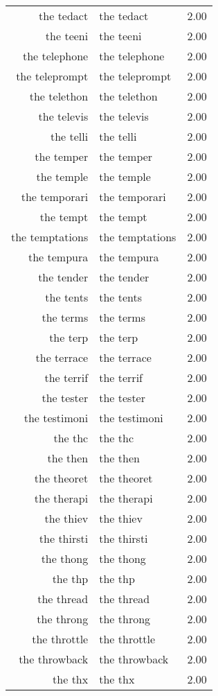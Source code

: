 \begin{table}[ht]
\begin{tabular}{rlr}
  the tedact & the tedact & 2.00 \\ 
  the teeni & the teeni & 2.00 \\ 
  the telephone & the telephone & 2.00 \\ 
  the teleprompt & the teleprompt & 2.00 \\ 
  the telethon & the telethon & 2.00 \\ 
  the televis & the televis & 2.00 \\ 
  the telli & the telli & 2.00 \\ 
  the temper & the temper & 2.00 \\ 
  the temple & the temple & 2.00 \\ 
  the temporari & the temporari & 2.00 \\ 
  the tempt & the tempt & 2.00 \\ 
  the temptations & the temptations & 2.00 \\ 
  the tempura & the tempura & 2.00 \\ 
  the tender & the tender & 2.00 \\ 
  the tents & the tents & 2.00 \\ 
  the terms & the terms & 2.00 \\ 
  the terp & the terp & 2.00 \\ 
  the terrace & the terrace & 2.00 \\ 
  the terrif & the terrif & 2.00 \\ 
  the tester & the tester & 2.00 \\ 
  the testimoni & the testimoni & 2.00 \\ 
  the thc & the thc & 2.00 \\ 
  the then & the then & 2.00 \\ 
  the theoret & the theoret & 2.00 \\ 
  the therapi & the therapi & 2.00 \\ 
  the thiev & the thiev & 2.00 \\ 
  the thirsti & the thirsti & 2.00 \\ 
  the thong & the thong & 2.00 \\ 
  the thp & the thp & 2.00 \\ 
  the thread & the thread & 2.00 \\ 
  the throng & the throng & 2.00 \\ 
  the throttle & the throttle & 2.00 \\ 
  the throwback & the throwback & 2.00 \\ 
  the thx & the thx & 2.00 \\ 

\end{tabular}
\end{table}
